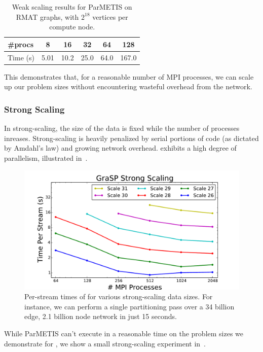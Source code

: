\begin{table}
\caption{Weak scaling results for ParMETIS on RMAT graphs, with $2^{18}$ vertices per compute node.}
\centering
\small
{ \begin{tabular}{ l | c | c | c | c | c }    \toprule
\#procs & 8 & 16 & 32 & 64 & 128 \\ \midrule
Time (s) & 5.01 & 10.2 & 25.0 & 64.0 & 167.0 \\
\hline
\end{tabular}\par
}
\label{tab:rmatpmweak}
\end{table}

This demonstrates that, for a reasonable number of MPI processes, we can scale up our problem sizes without encountering wasteful overhead from the network.

\subsubsection{Strong Scaling}
In strong-scaling, the size of the data is fixed while the number of processes inreases. 
Strong-scaling is heavily penalized by serial portions of code (as dictated by Amdahl's law) and growing network overhead. \ourmethod exhibits a high degree of parallelism, illustrated in~. 

\begin{figure}[b!]
\centering
  \includegraphics[width=0.9\columnwidth]{figures/strong_scaling.pdf}
  \caption{Per-stream times of \ourmethod for various strong-scaling data sizes. For instance, we can perform a single partitioning pass over a 34 billion edge, 2.1 billion node network in just 15 seconds.}
  \label{fig:kronspeed_strong}
\end{figure}

While ParMETIS can't execute in a reasonable time on the problem sizes we demonstrate for \ourmethod, we show a small strong-scaling experiment in~. 

